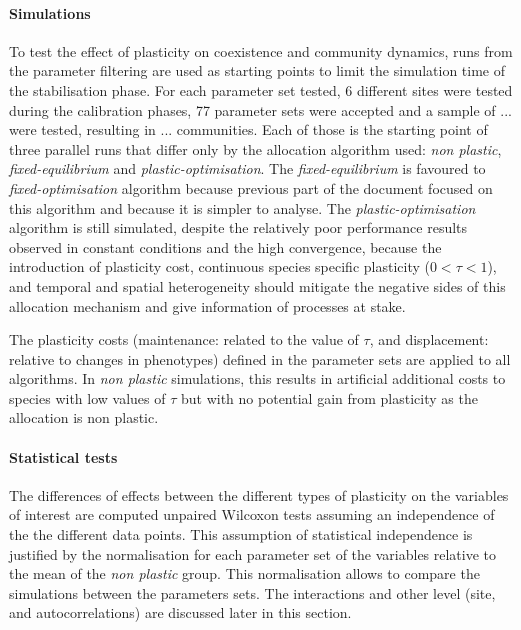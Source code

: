 \paragraph{Simulations}
To test the effect of plasticity on coexistence and community dynamics, runs from the parameter filtering are used as starting points to limit the simulation time of the stabilisation phase. For each parameter set tested, 6 different sites were tested during the calibration phases, 77 parameter sets were accepted and a sample of ... were tested, resulting in ... communities. Each of those is the starting point of three parallel runs that differ only by the allocation algorithm used: \textit{non plastic}, \textit{fixed-equilibrium} and \textit{plastic-optimisation}. The \textit{fixed-equilibrium} is favoured to \textit{fixed-optimisation} algorithm because previous part of the document focused on this algorithm and because it is simpler to analyse. The \textit{plastic-optimisation} algorithm is still simulated, despite the relatively poor performance results observed in constant conditions and the high convergence, because the introduction of plasticity cost, continuous species specific plasticity ($0 < \tau < 1$), and temporal and spatial heterogeneity should mitigate the negative sides of this allocation mechanism and give information of processes at stake.

The plasticity costs (maintenance: related to the value of $\tau$, and displacement: relative to changes in phenotypes) defined in the parameter sets are applied to all algorithms. In \textit{non plastic} simulations, this results in artificial additional costs to species with low values of $\tau$ but with no potential gain from plasticity as the allocation is non plastic. 


\paragraph{Statistical tests}

The differences of effects between the different types of plasticity on the variables of interest are computed unpaired Wilcoxon tests assuming an independence of the the different data points. This assumption of statistical independence is justified by the normalisation for each parameter set of the variables relative to the mean of the \textit{non plastic} group. This normalisation allows to compare the simulations between the parameters sets. The interactions and other level (site, and autocorrelations) are discussed later in this section. 

